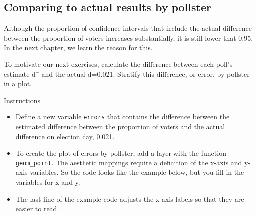 \documentclass[]{article}
\newenvironment{Shaded}{\begin{snugshade}}{\end{snugshade}}
\newcommand{\KeywordTok}[1]{\textcolor[rgb]{0.13,0.29,0.53}{\textbf{#1}}}
\newcommand{\DataTypeTok}[1]{\textcolor[rgb]{0.13,0.29,0.53}{#1}}
\newcommand{\FloatTok}[1]{\textcolor[rgb]{0.00,0.00,0.81}{#1}}
\newcommand{\StringTok}[1]{\textcolor[rgb]{0.31,0.60,0.02}{#1}}
\newcommand{\CommentTok}[1]{\textcolor[rgb]{0.56,0.35,0.01}{\textit{#1}}}
\newcommand{\OperatorTok}[1]{\textcolor[rgb]{0.81,0.36,0.00}{\textbf{#1}}}
\newcommand{\NormalTok}[1]{#1}
\providecommand{\tightlist}{%
  \setlength{\itemsep}{0pt}\setlength{\parskip}{0pt}}
\begin{document}
\begin{Shaded}
\end{Shaded}

\subsection{\texorpdfstring{\textbf{Comparing to actual results by
pollster}}{Comparing to actual results by pollster}}\label{comparing-to-actual-results-by-pollster}

Although the proportion of confidence intervals that include the actual
difference between the proportion of voters increases substantially, it
is still lower that 0.95. In the next chapter, we learn the reason for
this.

To motivate our next exercises, calculate the difference between each
poll's estimate d¯ and the actual d=0.021. Stratify this difference, or
error, by pollster in a plot.

Instructions

\begin{itemize}
\tightlist
\item
  Define a new variable \texttt{errors} that contains the difference
  between the estimated difference between the proportion of voters and
  the actual difference on election day, 0.021.
\item
  To create the plot of errors by pollster, add a layer with the
  function \texttt{geom\_point}. The aesthetic mappings require a
  definition of the x-axis and y-axis variables. So the code looks like
  the example below, but you fill in the variables for x and y.
\item
  The last line of the example code adjusts the x-axis labels so that
  they are easier to read.
\end{itemize}
\end{document}
